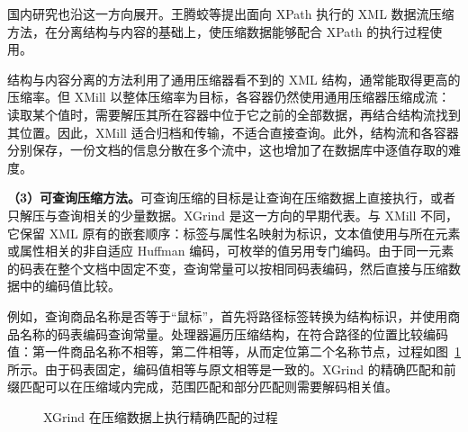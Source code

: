 国内研究也沿这一方向展开。王腾蛟等提出面向 XPath 执行的 XML 数据流压缩方法，在分离结构与内容的基础上，使压缩数据能够配合 XPath 的执行过程使用\cite{wang2005xpath}。

结构与内容分离的方法利用了通用压缩器看不到的 XML 结构，通常能取得更高的压缩率\cite{sakr2009xml}。但 XMill 以整体压缩率为目标，各容器仍然使用通用压缩器压缩成流：读取某个值时，需要解压其所在容器中位于它之前的全部数据，再结合结构流找到其位置。因此，XMill 适合归档和传输，不适合直接查询。此外，结构流和各容器分别保存，一份文档的信息分散在多个流中，这也增加了在数据库中逐值存取的难度。

\textbf{（3）可查询压缩方法。}可查询压缩的目标是让查询在压缩数据上直接执行，或者只解压与查询相关的少量数据。XGrind 是这一方向的早期代表\cite{tolani2002xgrind}。与 XMill 不同，它保留 XML 原有的嵌套顺序：标签与属性名映射为标识，文本值使用与所在元素或属性相关的非自适应 Huffman 编码，可枚举的值另用专门编码。由于同一元素的码表在整个文档中固定不变，查询常量可以按相同码表编码，然后直接与压缩数据中的编码值比较。

例如，查询商品名称是否等于“鼠标”，首先将路径标签转换为结构标识，并使用商品名称的码表编码查询常量。处理器遍历压缩结构，在符合路径的位置比较编码值：第一件商品名称不相等，第二件相等，从而定位第二个名称节点，过程如图~\ref{fig:foundation-xgrind} 所示。由于码表固定，编码值相等与原文相等是一致的。XGrind 的精确匹配和前缀匹配可以在压缩域内完成，范围匹配和部分匹配则需要解码相关值\cite{tolani2002xgrind}。

\begin{figure}[htbp]
\centering
{}
\caption{XGrind 在压缩数据上执行精确匹配的过程}
\label{fig:foundation-xgrind}
\end{figure}

